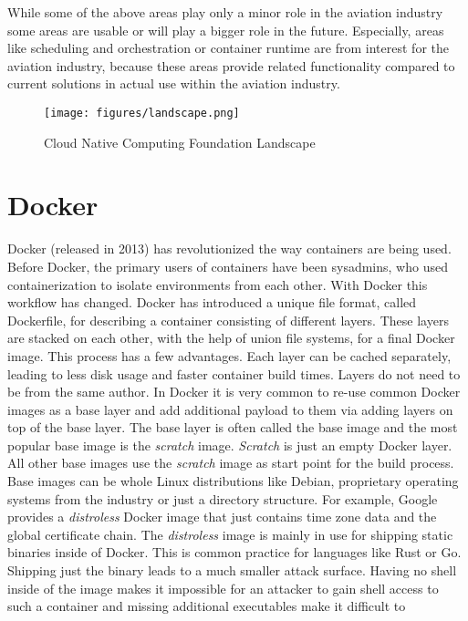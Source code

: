 \documentclass[titlepage]{report}
\begin{document}
While some of the above areas play only a minor role in the aviation industry some areas are usable or will play a bigger role in the future.
Especially, areas like scheduling and orchestration or container runtime are from interest for the aviation industry, because
these areas provide related functionality compared to current solutions in actual use within the aviation industry.

\begin{figure}[H]
    \centering
    \texttt{[image: figures/landscape.png]}
    \caption{Cloud Native Computing Foundation Landscape}\label{fig:landscape}
\end{figure}
 
\section{Docker}
Docker (released in 2013\cite{DockerRelease}) has revolutionized the way containers are being used.
Before Docker, the primary users of containers have been sysadmins, who used containerization to isolate environments from each other. With Docker
this workflow has changed. Docker has introduced a unique file format, called Dockerfile, for describing a container consisting of different layers. These layers
are stacked on each other, with the help of union file systems, for a final Docker image. This process has a few advantages. Each layer can be cached separately, leading
to less disk usage and faster container build times. Layers do not need to be from the same author. In Docker it is very common to re-use common Docker images
as a base layer and add additional payload to them via adding layers on top of the base layer. The base layer is often called the base image and the most popular
base image is the \emph{scratch} image. \emph{Scratch} is just an empty Docker layer. All other base images use the \emph{scratch} image as start point for the build process.
Base images can be whole Linux distributions like Debian, proprietary operating systems from the industry or just a directory structure. For example, Google provides
a \emph{distroless} Docker image that just contains time zone data and the global certificate chain\cite{Distroless}. The \emph{distroless} image is mainly in use for shipping
static binaries inside of Docker. This is common practice for languages like Rust or Go. Shipping just the binary leads to a much smaller attack surface. Having no shell inside
of the image makes it impossible for an attacker to gain shell access to such a container and missing additional executables make it difficult to
\end{document}

